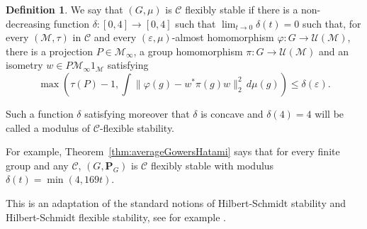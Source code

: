 \documentclass[10pt]{amsart}
\theoremstyle{plain}
\theoremstyle{definition}
\newtheorem{definition}[theorem]{Definition}
\newcommand{\cM}{\mathcal{M}}
\newcommand{\vn}{\mathcal{C}}
\newcommand{\cU}{\mathcal{U}}
\newcommand{\prob}{\mathbf{P}}
\begin{document}
\begin{definition}\label{def:flexible_stability}
We say that $(G,\mu)$ is $\vn$ flexibly stable if there is a non-decreasing function $\delta:[0,4]\to [0,4]$ such that $\lim_{t \to 0} \delta(t) = 0$ such that, for every $(\cM,\tau)$ in $\vn$ and every $(\varepsilon,\mu)$-almost homomorphism $\varphi: G \to \cU(\cM)$, there is a projection $P \in \cM_\infty$, a group homomorphism $\pi:G \to \cU(\cM)$ and an isometry $w \in P \cM_\infty 1_\cM$ satisfying
\[
\max\left(\tau(P)-1, \int \|\varphi(g) - w^*\pi(g)w\|_2^2 \,d\mu(g)\right) \leq \delta(\varepsilon).
\]

Such a function $\delta$ satisfying moreover that $\delta$ is concave and $\delta(4)=4$ will be called a modulus of $\vn$-flexible stability.
\end{definition}
For example, Theorem~\ref{thm:averageGowersHatami} says that for every finite group and any $\vn$, $(G,\prob_G)$ is $\vn$ flexibly stable with modulus $\delta(t) = \min(4,169 t)$.

This is an adaptation of the standard notions of Hilbert-Schmidt stability and Hilbert-Schmidt flexible stability, see for example \cite{Ioana2}.
\end{document}
